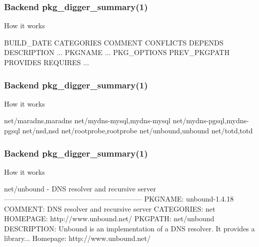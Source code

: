 \documentclass[hyperref=unicode,ascii,xcolor=dvipsnames]{beamer}
\begin{document}
\begin{frame}[fragile]
  \frametitle{Backend pkg\_digger\_summary(1)}
  \begin{block}{How it works}
    \begin{Code}{}
BUILD\_DATE
CATEGORIES
COMMENT
CONFLICTS
DEPENDS
DESCRIPTION
...
PKGNAME
...
PKG\_OPTIONS
PREV\_PKGPATH
PROVIDES
REQUIRES
...
\prompt{#}
    \end{Code}
  \end{block}
\end{frame}


\begin{frame}[fragile]
  \frametitle{Backend pkg\_digger\_summary(1)}
  \begin{block}{How it works}
    \begin{Code}{}
net/maradns,maradns
net/mydns-mysql,mydns-mysql
net/mydns-pgsql,mydns-pgsql
net/nsd,nsd
net/rootprobe,rootprobe
net/unbound,unbound
net/totd,totd
\prompt{# }
    \end{Code}
  \end{block}
\end{frame}


\begin{frame}[fragile]
  \frametitle{Backend pkg\_digger\_summary(1)}
  \begin{block}{How it works}
    \begin{Code}{}
net/unbound        - DNS resolver and recursive server
-----------------------------------------------------------
PKGNAME:        unbound-1.4.18
COMMENT:        DNS resolver and recursive server
CATEGORIES:     net
HOMEPAGE:       http://www.unbound.net/
PKGPATH:        net/unbound
DESCRIPTION:
    Unbound is an implementation of a DNS resolver.
    It provides a library...
    Homepage:
    http://www.unbound.net/

\prompt{#}
    \end{Code}
  \end{block}
\end{frame}
\end{document}
